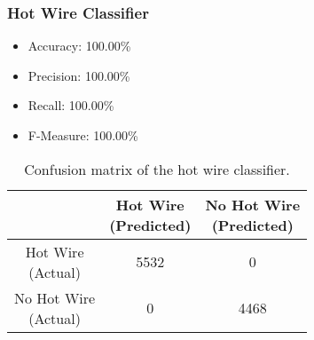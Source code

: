 \begin{frame}
  \frametitle{Hot Wire Classifier}
  \begin{itemize}
  \item Accuracy: 100.00\%
  \item Precision: 100.00\%
  \item Recall: 100.00\%
  \item F-Measure: 100.00\%
\end{itemize}
\begin{table}[h]
  \centering
  \renewcommand\theadfont{\bfseries}
  \begin{tabular}{|c|c|c|}
    \hline
    & \thead{Hot Wire\\(Predicted)} & \thead{No Hot Wire\\(Predicted)} \\
    \hline
    \thead{Hot Wire\\(Actual)} & 5532 & 0\\
    \hline
    \thead{No Hot Wire\\(Actual)} & 0 & 4468\\
    \hline
  \end{tabular}
  \caption{Confusion matrix of the hot wire classifier.}
\end{table}
\end{frame}
